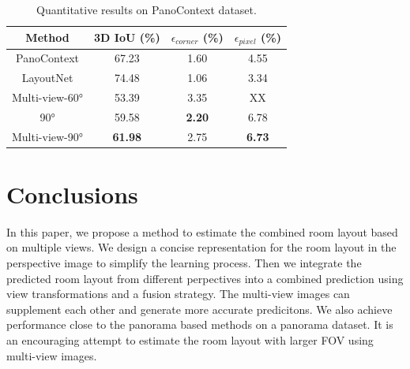 

\begin{table}
	\caption{Quantitative results on PanoContext dataset. }
	\label{tab:PC}
	\begin{tabular}{cccc}
		\toprule
		Method&3D IoU (\%)& $\epsilon_{corner}$ (\%) & $\epsilon_{pixel}$ (\%)\\
		\midrule
		PanoContext \cite{zhang2014panocontext} & 67.23 & 1.60 & 4.55\\
		LayoutNet \cite{zou2018layoutnet} & 74.48 & 1.06 & 3.34\\
		Multi-view-\ang{60} & 53.39 & 3.35 & XX\\	
		\ang{90} & 59.58 & \textbf{2.20} & 6.78\\	
		Multi-view-\ang{90} & \textbf{61.98} & 2.75 & \textbf{6.73}\\	
		\bottomrule
	\end{tabular}
\end{table}

\section{Conclusions}
In this paper, we propose a method to estimate the combined room layout based on multiple views. We design a concise representation for the room layout in the perspective image to simplify the learning process. Then we integrate the predicted room layout from different perpectives into a combined prediction using view transformations and a fusion strategy. The multi-view images can supplement each other and generate more accurate predicitons. We also achieve performance close to the panorama based methods on a panorama dataset. It is an encouraging attempt to estimate the room layout with larger FOV using multi-view images.


